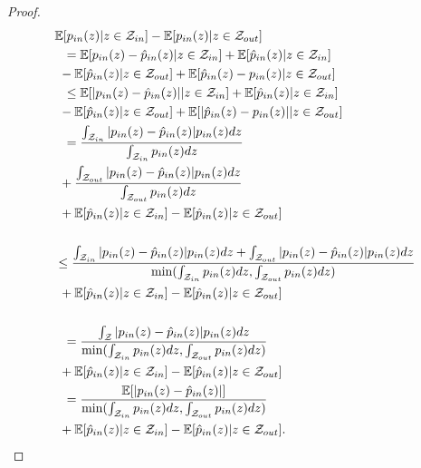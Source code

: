 \begin{proof}

\begin{align*}
     &\mathbb{E}[p_{in}(\*z)|{\*z \in \mathcal{Z}_{in}} ]  - 
    \mathbb{E}[p_{in}(\*z)|{\*z \in \mathcal{Z}_{out}}]
    \\ 
    &~~=  \mathbb{E}[p_{in}(\*z) - \hat{p}_{in}(\*z)|{\*z \in \mathcal{Z}_{in}}] + 
    \mathbb{E}[\hat{p}_{in}(\*z)|{\*z \in \mathcal{Z}_{in}}] \\
    &~- \mathbb{E}[\hat{p}_{in}(\*z)|{\*z \in \mathcal{Z}_{out}}] +
    \mathbb{E}[\hat{p}_{in}(\*z) - p_{in}(\*z)|{\*z \in \mathcal{Z}_{out}}] 
    \\ &~~\leq  \mathbb{E}[|p_{in}(\*z) - \hat{p}_{in}(\*z)| | {\*z \in \mathcal{Z}_{in}}] + 
    \mathbb{E}[\hat{p}_{in}(\*z)|{\*z \in \mathcal{Z}_{in}}]\\
    &~- \mathbb{E}[\hat{p}_{in}(\*z)|{\*z \in \mathcal{Z}_{out}}] +
    \mathbb{E}[|\hat{p}_{in}(\*z) - p_{in}(\*z)| | {\*z \in \mathcal{Z}_{out}}] 
    \\
    &~~= \frac{\int_{\mathcal{Z}_{in}} |p_{in}(\*z) - \hat{p}_{in}(\*z)| p_{in}(\*z) d\*z }{\int_{\mathcal{Z}_{in}}  p_{in}(\*z) d\*z } \\
    &~+ \frac{\int_{\mathcal{Z}_{out}} |p_{in}(\*z) - \hat{p}_{in}(\*z)| p_{in}(\*z) d\*z }{\int_{\mathcal{Z}_{out}}  p_{in}(\*z) d\*z }  \\
    &~+  \mathbb{E}[\hat{p}_{in}(\*z)|{\*z \in \mathcal{Z}_{in}}] - \mathbb{E}[\hat{p}_{in}(\*z)|{\*z \in \mathcal{Z}_{out}}]\\
    \\ &\leq \frac{\int_{\mathcal{Z}_{in}} |p_{in}(\*z) - \hat{p}_{in}(\*z)| p_{in}(\*z) d\*z  + \int_{\mathcal{Z}_{out}} |p_{in}(\*z) - \hat{p}_{in}(\*z)| p_{in}(\*z) d\*z }{\min(\int_{\mathcal{Z}_{in}}  p_{in}(\*z) d\*z, \int_{\mathcal{Z}_{out}}  p_{in}(\*z) d\*z) }\\
    &~+ \mathbb{E}[\hat{p}_{in}(\*z)|{\*z \in \mathcal{Z}_{in}}] - \mathbb{E}[\hat{p}_{in}(\*z)|{\*z \in \mathcal{Z}_{out}}] \\
    \\ &~~= \frac{\int_{\mathcal{Z}} |p_{in}(\*z) - \hat{p}_{in}(\*z)| p_{in}(\*z) d\*z  }{\min(\int_{\mathcal{Z}_{in}}  p_{in}(\*z) d\*z, \int_{\mathcal{Z}_{out}}  p_{in}(\*z) d\*z) } \\
    &~+ \mathbb{E}[\hat{p}_{in}(\*z)|{\*z \in \mathcal{Z}_{in}}] - \mathbb{E}[\hat{p}_{in}(\*z)|{\*z \in \mathcal{Z}_{out}}]
    \\ &~~= \frac{\mathbb{E}[|p_{in}(\*z) - \hat{p}_{in}(\*z)|] }{\min(\int_{\mathcal{Z}_{in}}  p_{in}(\*z) d\*z, \int_{\mathcal{Z}_{out}}  p_{in}(\*z) d\*z) } \\
    &~+ \mathbb{E}[\hat{p}_{in}(\*z)|{\*z \in \mathcal{Z}_{in}}] - \mathbb{E}[\hat{p}_{in}(\*z)|{\*z \in \mathcal{Z}_{out}}].
\end{align*}



\end{proof}

